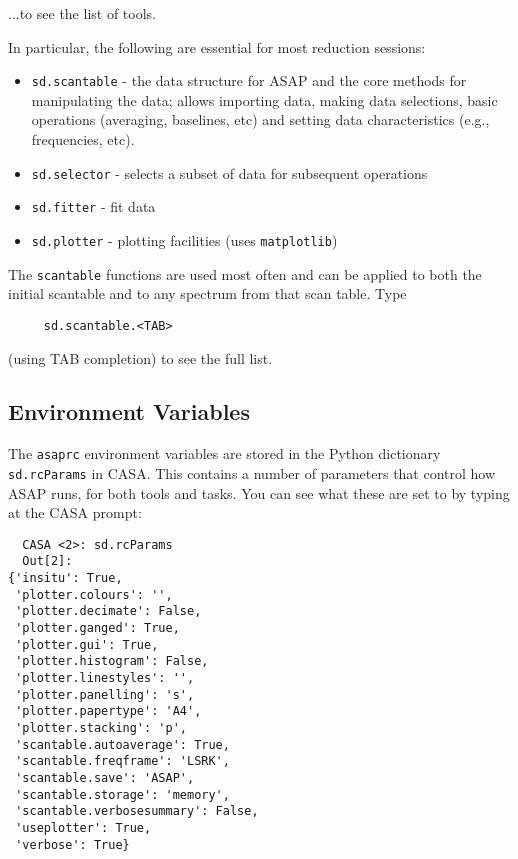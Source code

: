 ...to see the list of tools.

In particular, the following are essential for most reduction
sessions: 
\begin{itemize}
   \item {\tt sd.scantable} - the data structure for ASAP and the core
         methods for manipulating the data; allows importing data,
         making data selections, basic operations (averaging,
         baselines, etc) and setting data characteristics (e.g.,
         frequencies, etc).
   \item {\tt sd.selector} - selects a subset of data for subsequent operations
   \item {\tt sd.fitter} - fit data 
   \item {\tt sd.plotter} - plotting facilities (uses {\tt matplotlib})
\end{itemize}

The {\tt scantable} functions are used most often and can be applied
to both the initial scantable and to any spectrum from that scan
table.  Type
\small
\begin{verbatim}
     sd.scantable.<TAB>
\end{verbatim}
\normalsize
(using TAB completion) to see the full list. 

\subsection{Environment Variables}
\label{subsection:sd.asap.environ}

The {\tt asaprc} environment variables are stored in the Python
dictionary {\tt sd.rcParams} in CASA.  This contains a number
of parameters that control how ASAP runs, for both tools and
tasks.  You can see what these are set to by typing at the
CASA prompt:

\small
\begin{verbatim}
  CASA <2>: sd.rcParams
  Out[2]: 
{'insitu': True,
 'plotter.colours': '',
 'plotter.decimate': False,
 'plotter.ganged': True,
 'plotter.gui': True,
 'plotter.histogram': False,
 'plotter.linestyles': '',
 'plotter.panelling': 's',
 'plotter.papertype': 'A4',
 'plotter.stacking': 'p',
 'scantable.autoaverage': True,
 'scantable.freqframe': 'LSRK',
 'scantable.save': 'ASAP',
 'scantable.storage': 'memory',
 'scantable.verbosesummary': False,
 'useplotter': True,
 'verbose': True}
\end{verbatim}
\normalsize

